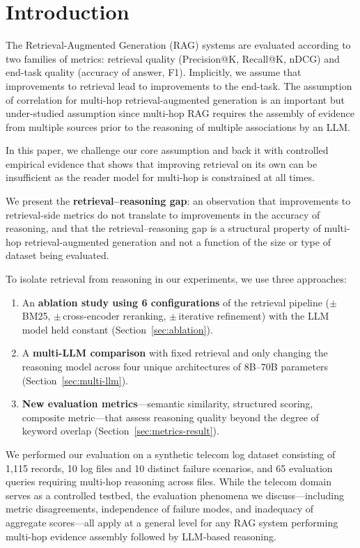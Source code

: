 \documentclass[11pt,a4paper]{article}
\begin{document}
\section{Introduction}

The Retrieval-Augmented Generation (RAG) systems
\citep{lewis2020rag,gao2023ragsurvey} are evaluated according to
two families of metrics: retrieval quality (Precision@K, Recall@K,
nDCG) and end-task quality (accuracy of answer, F1).
Implicitly, we assume that improvements to retrieval lead to
improvements to the end-task.
The assumption of correlation for multi-hop retrieval-augmented
generation is an important but under-studied assumption since
multi-hop RAG requires the assembly of evidence from multiple
sources prior to the reasoning of multiple associations by an LLM.

In this paper, we challenge our core assumption and back it with
controlled empirical evidence that shows that improving retrieval
on its own can be insufficient as the reader model for multi-hop
is constrained at all times.

We present the \textbf{retrieval--reasoning gap}: an observation
that improvements to retrieval-side metrics do not translate to
improvements in the accuracy of reasoning, and that the
retrieval--reasoning gap is a structural property of multi-hop
retrieval-augmented generation and not a function of the size or
type of dataset being evaluated.

To isolate retrieval from reasoning in our experiments, we use
three approaches:
\begin{enumerate}[nosep]
    \item An \textbf{ablation study using 6 configurations} of the
    retrieval pipeline ($\pm$\,BM25, $\pm$\,cross-encoder reranking,
    $\pm$\,iterative refinement) with the LLM model held constant
    (Section~\ref{sec:ablation}).
    \item A \textbf{multi-LLM comparison} with fixed retrieval and
    only changing the reasoning model across four unique architectures
    of 8B--70B parameters (Section~\ref{sec:multi-llm}).
    \item \textbf{New evaluation metrics}---semantic similarity,
    structured scoring, composite metric---that assess reasoning
    quality beyond the degree of keyword overlap
    (Section~\ref{sec:metrics-result}).
\end{enumerate}

We performed our evaluation on a synthetic telecom log dataset
consisting of 1{,}115 records, 10 log files and 10 distinct failure
scenarios, and 65 evaluation queries requiring multi-hop reasoning
across files.
While the telecom domain serves as a controlled testbed, the
evaluation phenomena we discuss---including metric disagreements,
independence of failure modes, and inadequacy of aggregate
scores---all apply at a general level for any RAG system performing
multi-hop evidence assembly followed by LLM-based reasoning.
\end{document}
